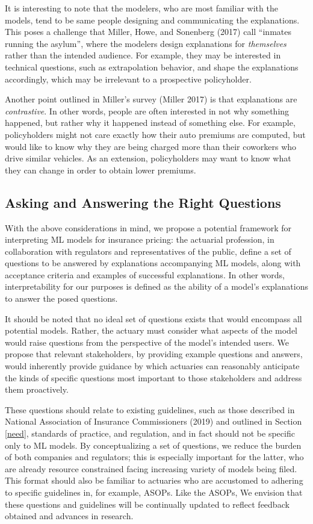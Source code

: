 \documentclass[preprint, 3p, twocolumn, letterpaper, 10pt]{elsarticle} %
\begin{document}
It is interesting to note that the modelers, who are most familiar with the
models, tend to be same people designing and communicating the explanations.
This poses a challenge that Miller, Howe, and Sonenberg (2017) call ``inmates running
the asylum'', where the modelers design explanations for \emph{themselves} rather
than the intended audience. For example, they may be interested in technical
questions, such as extrapolation behavior, and shape the explanations accordingly,
which may be irrelevant to a prospective policyholder.

Another point outlined in Miller's survey (Miller 2017) is
that explanations are \emph{contrastive}. In other words, people are often interested
in not why something happened, but rather why it happened instead of something
else. For example, policyholders might not care exactly how their auto premiums
are computed, but would like to know why they are being charged more than their
coworkers who drive similar vehicles. As an extension, policyholders may want
to know what they can change in order to obtain lower premiums.

\hypertarget{asking-and-answering-the-right-questions}{%
\subsection{Asking and Answering the Right Questions}\label{asking-and-answering-the-right-questions}}

With the above considerations in mind, we propose a potential framework for
interpreting ML models for insurance pricing: the actuarial profession, in
collaboration with regulators and representatives of the public, define a set
of questions to be answered by explanations accompanying ML models, along
with acceptance criteria and examples of successful explanations. In other
words, interpretability for our purposes is defined as the ability of a model's
explanations to answer the posed questions.

It should be noted that no ideal set of questions exists that would encompass
all potential models. Rather, the actuary must consider what aspects of the
model would raise questions from the perspective of the model's intended users.
We propose that relevant stakeholders, by providing example questions and
answers, would inherently provide guidance by which actuaries can reasonably
anticipate the kinds of specific questions most important to those stakeholders
and address them proactively.

These questions should relate to existing guidelines, such as those described in
National Association of Insurance Commissioners (2019) and outlined in Section \ref{need}, standards of practice, and
regulation, and in fact should not be specific only to ML models. By
conceptualizing a set of questions, we reduce the burden of both companies and
regulators; this is especially important for the latter, who are already
resource constrained facing increasing variety of models being filed. This
format should also be familiar to actuaries who are accustomed to adhering to
specific guidelines in, for example, ASOPs. Like the ASOPs, We envision that
these questions and guidelines will be continually updated to reflect feedback
obtained and advances in research.
\end{document}
